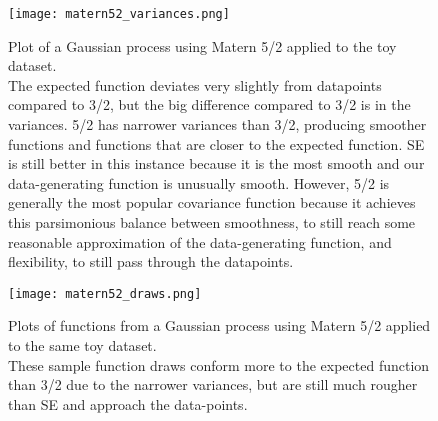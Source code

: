 \begin{figure}[H]
    \texttt{[image: matern52\_variances.png]}
    \caption{
        Plot of a Gaussian process using Matern 5/2 applied to the toy dataset. \\
        The expected function deviates very slightly from datapoints compared to 3/2, but the big difference compared to 3/2 is in the variances. 5/2 has narrower variances than 3/2, producing smoother functions and functions that are closer to the expected function. SE is still better in this instance because it is the most smooth and our data-generating function is unusually smooth. However, 5/2 is generally the most popular covariance function because it achieves this parsimonious balance between smoothness, to still reach some reasonable approximation of the data-generating function, and flexibility, to still pass through the datapoints. 
    }
\end{figure}

\begin{figure}[H]
    \texttt{[image: matern52\_draws.png]}
    \caption{
        Plots of functions from a Gaussian process using Matern 5/2 applied to the same toy dataset. \\
        These sample function draws conform more to the expected function than 3/2 due to the narrower variances, but are still much rougher than SE and approach the data-points.
    }
\end{figure}





% 
% 
% 


